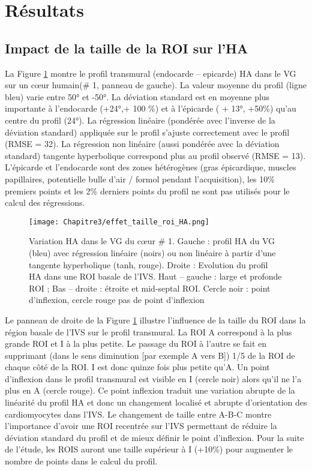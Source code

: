 \section{Résultats}
\subsection{Impact de la taille de la ROI sur l'HA}

La Figure \ref{fig:taille_HA} montre le profil transmural (endocarde – epicarde) HA dans le VG sur un cœur humain(\# 1, panneau de gauche). La valeur moyenne du profil (ligne bleu) varie entre 50° et -50°. La déviation standard est en moyenne plus importante à l’endocarde (+24°,+ 100 \%) et à l’épicarde ( + 13°, +50\%) qu’au centre du profil (24°).  La régression linéaire (pondérée avec l’inverse de la déviation standard) appliquée sur le profil s’ajuste correctement avec le profil (RMSE = 32). La régression non linéaire (aussi pondérée avec la déviation standard) tangente hyperbolique correspond plus au profil observé (RMSE = 13). L’épicarde et l’endocarde sont des zones hétérogènes (gras épicardique, muscles papillaires, potentielle bulle d’air / formol pendant l’acquisition), les 10\% premiers points et les 2\% derniers points du profil ne sont pas utilisés pour le calcul des régressions.

\begin{figure}[!ht]
  \begin{center}
    \texttt{[image: Chapitre3/effet\_taille\_roi\_HA.png]}
  \end{center}
  \caption{Variation HA dans le VG du cœur \# 1. Gauche : profil HA du VG (bleu) avec régression linéaire (noirs) ou non linéaire à partir d’une tangente hyperbolique (tanh, rouge). Droite :  Evolution du profil HA dans une ROI basale de l’IVS. Haut – gauche : large et profonde ROI ; Bas – droite : étroite et mid-septal ROI. Cercle noir : point d’inflexion, cercle rouge pas de point d’inflexion}
  \label{fig:taille_HA}
\end{figure}
Le panneau de droite de la Figure \ref{fig:taille_HA} illustre l’influence de la taille du ROI dans la région basale de l’IVS sur le profil transmural. La ROI A correspond à la plus grande ROI et I à la plus petite. Le passage du ROI à l’autre se fait en supprimant (dans le sens diminution [par exemple A vers B]) 1/5 de la ROI de chaque côté de la ROI. I est donc quinze fois plus petite qu’A. Un point d’inflexion dans le profil transmural est visible en I (cercle noir) alors qu’il ne l’a plus en A (cercle rouge).  Ce point inflexion traduit une variation abrupte de la linéarité du profil HA et donc un changement localisé et abrupte d’orientation des cardiomyocytes dans l’IVS. Le changement de taille entre A-B-C montre l’importance d’avoir une ROI recentrée sur l’IVS permettant de réduire la déviation standard du profil et de mieux définir le point d’inflexion. Pour la suite de l’étude, les ROIS auront une taille supérieur à I (+10\%) pour augmenter le nombre de points dans le calcul du profil. 

